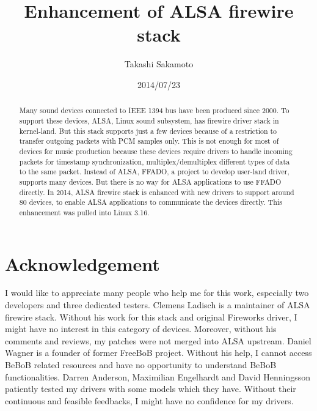 \documentclass[onecolumn]{article}
\begin{document}

\title{Enhancement of ALSA firewire stack}
\author{Takashi Sakamoto}
\date{2014/07/23}
\maketitle{}

\begin{abstract}

Many sound devices connected to IEEE 1394 bus have been produced since 2000. To support these devices, ALSA, Linux sound subsystem, has firewire driver stack in kernel-land. But this stack supports just a few devices because of a restriction to transfer outgoing packets with PCM samples only. This is not enough for most of devices for music production because these devices require drivers to handle incoming packets for timestamp synchronization, multiplex/demultiplex different types of data to the same packet. Instead of ALSA, FFADO, a project to develop user-land driver, supports many devices. But there is no way for ALSA applications to use FFADO directly. In 2014, ALSA firewire stack is enhanced with new drivers to support around 80 devices, to enable ALSA applications to communicate the devices directly. This enhancement was pulled into Linux 3.16.

\end{abstract}

\section*{Acknowledgement}

I would like to appreciate many people who help me for this work, especially two developers and three dedicated testers. Clemens Ladisch is a maintainer of ALSA firewire stack. Without his work for this stack and original Fireworks driver, I might have no interest in this category of devices. Moreover, without his comments and reviews, my patches were not merged into ALSA upstream. Daniel Wagner is a founder of former FreeBoB project. Without his help, I cannot access BeBoB related resources and have no opportunity to understand BeBoB functionalities. Darren Anderson, Maximilian Engelhardt and David Henningsson patiently tested my drivers with some models which they have. Without their continuous and feasible feedbacks, I might have no confidence for my drivers.

\newpage

\tableofcontents
\end{document}
